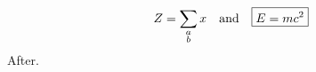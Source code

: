 \documentclass{article}
\begin{document}
\begin{eqnarray}
Z=\sum_{\substack{a\cr b}} x \quad \text{and} \quad \boxed{E=mc^2}
\end{eqnarray}
After.
\end{document}
